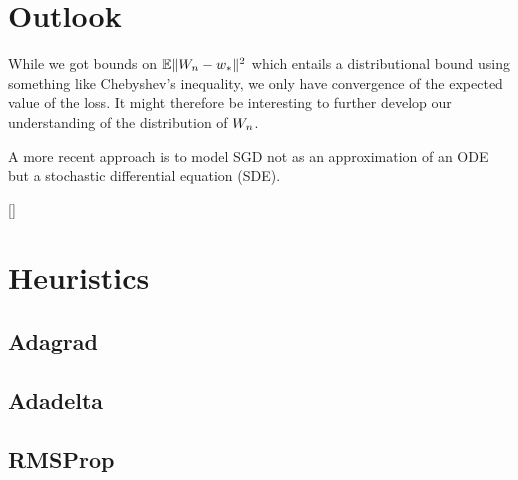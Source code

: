\section{Outlook}

While we got bounds on \(\mathbb{E}\|W_n - w_*\|^2\) which entails a
distributional bound using something like Chebyshev's inequality, we only
have convergence of the expected value of the loss. It might therefore be
interesting to further develop our understanding of the distribution of \(W_n\).

A more recent approach is to model SGD not as an approximation of an ODE but a
stochastic differential equation (SDE).


[\textcite{simsekliTailIndexAnalysisStochastic2019}]


\section{Heuristics}

\subsection{Adagrad}

\subsection{Adadelta}

\subsection{RMSProp}


\endinput
